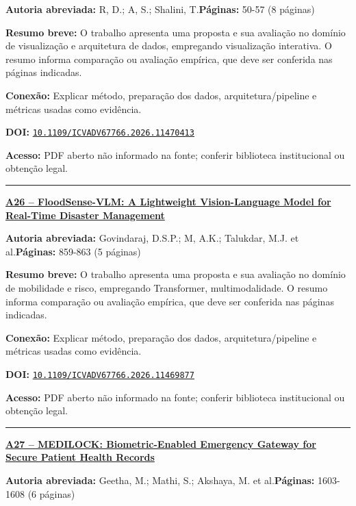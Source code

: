 \documentclass[10pt,a4paper]{article}
\begin{document}
\textbf{Autoria abreviada:} R, D.; A, S.; Shalini, T.\quad \textbf{Páginas:} 50-57 (8 páginas)\par
\textbf{Resumo breve:} O trabalho apresenta uma proposta e sua avaliação no domínio de visualização e arquitetura de dados, empregando visualização interativa. O resumo informa comparação ou avaliação empírica, que deve ser conferida nas páginas indicadas.\par
\textbf{Conexão:} Explicar método, preparação dos dados, arquitetura/pipeline e métricas usadas como evidência.\par
\textbf{DOI:} \href{https://doi.org/10.1109/ICVADV67766.2026.11470413}{\nolinkurl{10.1109/ICVADV67766.2026.11470413}}\par
\textbf{Acesso:} PDF aberto não informado na fonte; conferir biblioteca institucional ou obtenção legal.\par
\noindent\rule{\textwidth}{0.35pt}
\par\medskip\noindent
{\large\bfseries\href{https://doi.org/10.1109/ICVADV67766.2026.11469877}{A26 -- FloodSense-VLM: A Lightweight Vision-Language Model for Real-Time Disaster Management}}\par\smallskip
\textbf{Autoria abreviada:} Govindaraj, D.S.P.; M, A.K.; Talukdar, M.J. et al.\quad \textbf{Páginas:} 859-863 (5 páginas)\par
\textbf{Resumo breve:} O trabalho apresenta uma proposta e sua avaliação no domínio de mobilidade e risco, empregando Transformer, multimodalidade. O resumo informa comparação ou avaliação empírica, que deve ser conferida nas páginas indicadas.\par
\textbf{Conexão:} Explicar método, preparação dos dados, arquitetura/pipeline e métricas usadas como evidência.\par
\textbf{DOI:} \href{https://doi.org/10.1109/ICVADV67766.2026.11469877}{\nolinkurl{10.1109/ICVADV67766.2026.11469877}}\par
\textbf{Acesso:} PDF aberto não informado na fonte; conferir biblioteca institucional ou obtenção legal.\par
\noindent\rule{\textwidth}{0.35pt}
\par\medskip\noindent
{\large\bfseries\href{https://doi.org/10.1109/ICVADV67766.2026.11470493}{A27 -- MEDILOCK: Biometric-Enabled Emergency Gateway for Secure Patient Health Records}}\par\smallskip
\textbf{Autoria abreviada:} Geetha, M.; Mathi, S.; Akshaya, M. et al.\quad \textbf{Páginas:} 1603-1608 (6 páginas)\par
\end{document}
